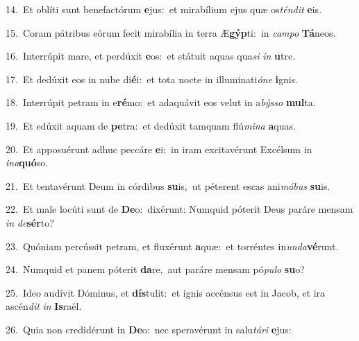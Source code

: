 {\numbfont\textcolor{\numbcolor}{14.}}~Et oblíti sunt benefactórum \textbf{e}\-jus:~\star et mirabílium ejus quæ os\-\textit{tén}\-\textit{dit} \textbf{e}\-is.\par
{\numbfont\textcolor{\numbcolor}{15.}}~Coram pátribus eórum fecit mirabília in terra Æ\-\textbf{gýp}\-ti:~\star in \textit{cam}\-\textit{po} \textbf{Tá}\-neos.\par
{\numbfont\textcolor{\numbcolor}{16.}}~Interrúpit mare, et perdúxit \textbf{e}\-os:~\star et státuit aquas qua\textit{si} \textit{in} \textbf{u}\-tre.\par
{\numbfont\textcolor{\numbcolor}{17.}}~Et dedúxit eos in nube di\-\textbf{é}\-i:~\star et tota nocte in illuminati\-\textit{ó}\-\textit{ne} \textbf{i}\-gnis.\par
{\numbfont\textcolor{\numbcolor}{18.}}~Interrúpit petram in e\-\textbf{ré}\-mo:~\star et adaquávit eos velut in a\-\textit{býs}\-\textit{so} \textbf{mul}\-ta.\par
{\numbfont\textcolor{\numbcolor}{19.}}~Et edúxit aquam de \textbf{pe}\-tra:~\star et dedúxit tamquam flú\-\textit{mi}\-\textit{na} \textbf{a}\-quas.\par
{\numbfont\textcolor{\numbcolor}{20.}}~Et apposuérunt adhuc peccáre \textbf{e}\-i:~\star in iram excitavérunt Excélsum in \textit{in}\-\textit{a}\textbf{quó}so.\par
{\numbfont\textcolor{\numbcolor}{21.}}~Et tentavérunt Deum in córdibus \textbf{su}\-is,~\star ut péterent escas ani\-\textit{má}\-\textit{bus} \textbf{su}\-is.\par
{\numbfont\textcolor{\numbcolor}{22.}}~Et male locúti sunt de \textbf{De}\-o:~\star dixérunt: Numquid póterit Deus paráre mensam \textit{in} \textit{de}\-\textbf{sér}to?\par
{\numbfont\textcolor{\numbcolor}{23.}}~Quóniam percússit petram, et fluxérunt \textbf{a}\-quæ:~\star et torréntes in\-\textit{un}\-\textit{da}\textbf{vé}runt.\par
{\numbfont\textcolor{\numbcolor}{24.}}~Numquid et panem póterit \textbf{da}\-re,~\star aut paráre mensam pó\-\textit{pu}\-\textit{lo} \textbf{su}\-o?\par
{\numbfont\textcolor{\numbcolor}{25.}}~Ideo audívit Dóminus, et \textbf{dís}\-tulit:~\star et ignis accénsus est in Jacob, et ira ascén\textit{dit} \textit{in} \textbf{Is}\-raël.\par
{\numbfont\textcolor{\numbcolor}{26.}}~Quia non credidérunt in \textbf{De}\-o:~\star nec speravérunt in salu\-\textit{tá}\-\textit{ri} \textbf{e}\-jus:\par
